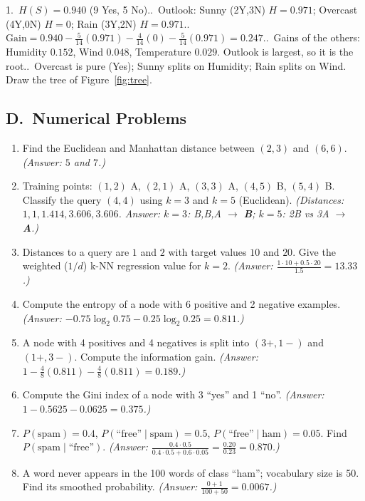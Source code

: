 \begin{modelans}
1.~$H(S)=0.940$ (9 Yes, 5 No)..~Outlook: Sunny (2Y,3N) $H=0.971$; Overcast (4Y,0N) $H=0$; Rain (3Y,2N) $H=0.971$..~$\text{Gain}=0.940-\tfrac5{14}(0.971)-\tfrac4{14}(0)-\tfrac5{14}(0.971)=0.247$..~Gains of the others: Humidity $0.152$, Wind $0.048$, Temperature $0.029$. Outlook is largest, so it is the root..~Overcast is pure (Yes); Sunny splits on Humidity; Rain splits on Wind. Draw the tree of Figure~\ref{fig:tree}.
\end{modelans}

\subsection*{D.\ Numerical Problems}
\begin{enumerate}
  \item Find the Euclidean and Manhattan distance between $(2,3)$ and $(6,6)$. \textit{(Answer: $5$ and $7$.)}
  \item Training points: $(1,2)$ A, $(2,1)$ A, $(3,3)$ A, $(4,5)$ B, $(5,4)$ B. Classify the query $(4,4)$ using $k=3$ and $k=5$ (Euclidean). \textit{(Distances: $1,1,1.414,3.606,3.606$. Answer: $k=3$: B,B,A $\to$ \textbf{B}; $k=5$: 2B vs 3A $\to$ \textbf{A}.)}
  \item Distances to a query are $1$ and $2$ with target values $10$ and $20$. Give the weighted ($1/d$) k-NN regression value for $k=2$. \textit{(Answer: $\frac{1\cdot10+0.5\cdot20}{1.5}=13.33$.)}
  \item Compute the entropy of a node with 6 positive and 2 negative examples. \textit{(Answer: $-0.75\log_2 0.75-0.25\log_2 0.25=0.811$.)}
  \item A node with 4 positives and 4 negatives is split into $(3+,1-)$ and $(1+,3-)$. Compute the information gain. \textit{(Answer: $1-\tfrac48(0.811)-\tfrac48(0.811)=0.189$.)}
  \item Compute the Gini index of a node with 3 ``yes'' and 1 ``no''. \textit{(Answer: $1-0.5625-0.0625=0.375$.)}
  \item $P(\text{spam})=0.4$, $P(\text{``free''}\mid\text{spam})=0.5$, $P(\text{``free''}\mid\text{ham})=0.05$. Find $P(\text{spam}\mid\text{``free''})$. \textit{(Answer: $\frac{0.4\cdot0.5}{0.4\cdot0.5+0.6\cdot0.05}=\frac{0.20}{0.23}=0.870$.)}
  \item A word never appears in the 100 words of class ``ham''; vocabulary size is 50. Find its smoothed probability. \textit{(Answer: $\frac{0+1}{100+50}=0.0067$.)}
\end{enumerate}

